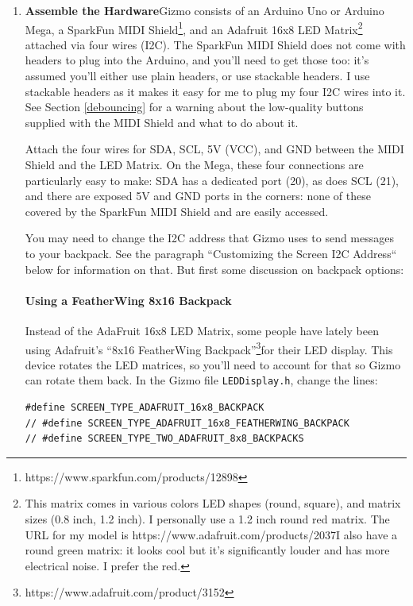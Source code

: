 \documentclass{article}
\begin{document}
\begin{enumerate}

\item {\bf Assemble the Hardware}\quad Gizmo consists of an Arduino Uno or Arduino Mega, a SparkFun MIDI Shield\footnote{https:/\!/www.sparkfun.com/products/12898}, and an Adafruit 16x8 LED Matrix\footnote{This matrix comes in various colors LED shapes (round, square), and matrix sizes (0.8 inch, 1.2 inch).  I personally use a 1.2 inch round red matrix.  The URL for my model is https:/\!/www.adafruit.com/products/2037\quad I also have a round green matrix: it looks cool but it's significantly louder and has more electrical noise.  I prefer the red.} attached via four wires (I2C).  The SparkFun MIDI Shield does not come with headers to plug into the Arduino, and you'll need to get those too: it's assumed you'll either use plain headers, or use stackable headers.  I use stackable headers as it makes it easy for me to plug my four I2C wires into it.  See Section \ref{debouncing} for a warning about the low-quality buttons supplied with the MIDI Shield and what to do about it.

Attach the four wires for SDA, SCL, 5V (VCC), and GND between the MIDI Shield and the LED Matrix.  On the Mega, these four connections are particularly easy to make: SDA has a dedicated port (20), as does SCL (21), and there are exposed 5V and GND ports in the corners: none of these covered by the SparkFun MIDI Shield and are easily accessed.

You may need to change the I2C address that Gizmo uses to send messages to your backpack.  See the paragraph ``Customizing the Screen I2C Address`` below for information on that.  But first some discussion on backpack options:

\paragraph{Using a FeatherWing 8x16 Backpack} Instead of the AdaFruit 16x8 LED Matrix, some people have lately been using Adafruit's ``8x16 FeatherWing Backpack''\footnote{https:/\!/www.adafruit.com/product/3152}for their LED display.   This device rotates the LED matrices, so you'll need to account for that so Gizmo can rotate them back.  In the Gizmo file \texttt{LEDDisplay.h}, change the lines:

\begin{verbatim}
#define SCREEN_TYPE_ADAFRUIT_16x8_BACKPACK
// #define SCREEN_TYPE_ADAFRUIT_16x8_FEATHERWING_BACKPACK
// #define SCREEN_TYPE_TWO_ADAFRUIT_8x8_BACKPACKS
\end{verbatim}


\end{enumerate}
\end{document}
